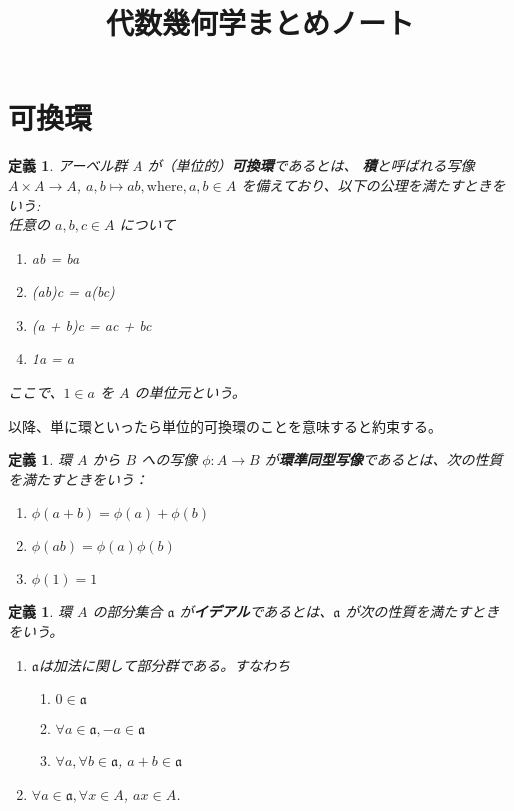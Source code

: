 \documentclass[uplatex]{jsreport}
\title{代数幾何学まとめノート}
\date{}
\newtheorem{dfn}[thm]{定義}
\newcommand{\mfa}{\mathfrak{a}}
\begin{document}
\maketitle

\section{可換環}
\begin{dfn}
アーベル群 A が（単位的）\textbf{可換環}であるとは、
\textbf{積}と呼ばれる写像 $A \times A \to A$, $a, b \mapsto ab, \text{where}, a, b \in A$
を備えており、以下の公理を満たすときをいう: \\

任意の $a, b, c \in A$ について
\begin{enumerate}
    \item ab = ba
    \item (ab)c = a(bc)
    \item (a + b)c = ac + bc
    \item 1a = a
\end{enumerate}
ここで、$1 \in a$ を $A$ の単位元という。
\end{dfn}
以降、単に環といったら単位的可換環のことを意味すると約束する。

\begin{dfn}
    環 $A$ から $B$ への写像 $\phi: A \to B$ が\textbf{環準同型写像}であるとは、次の性質を満たすときをいう：
    \begin{enumerate}
        \item $\phi(a + b) = \phi(a) + \phi(b)$
        \item $\phi(ab) = \phi(a)\phi(b)$
        \item $\phi(1) = 1$
    \end{enumerate}
\end{dfn}

\begin{dfn}
    環 $A$ の部分集合 $\mfa$ が\textbf{イデアル}であるとは、$\mfa$ が次の性質を満たすときをいう。
    \begin{enumerate}
        \item $\mfa$は加法に関して部分群である。すなわち
        \begin{enumerate}
            \item $0 \in \mfa$
            \item $\forall a \in \mfa, -a \in \mfa$
            \item $\forall a, \forall b \in \mfa$, $a + b \in \mfa$
        \end{enumerate}
        \item $\forall a \in \mfa, \forall x \in A$, $ax \in A$.
    \end{enumerate}
\end{dfn}
\end{document}
